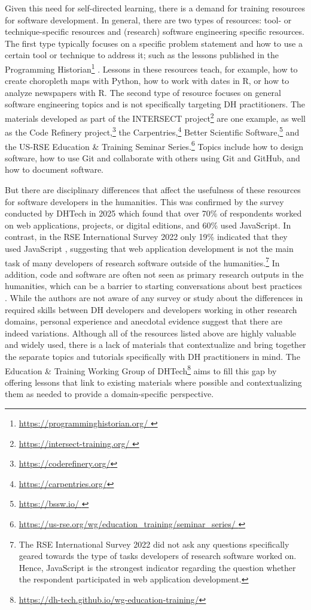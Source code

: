 \documentclass[final]{anthology-ch} %
\begin{document}
Given this need for self-directed learning, there is a demand for training resources for software development. In general, there are two types of resources: tool- or technique-specific resources and (research) software engineering specific resources. The first type typically focuses on a specific problem statement and how to use a certain tool or technique to address it; such as the  lessons published in the Programming Historian\footnote{\url{https://programminghistorian.org/
}} \cite{mullen2025, ryan2021}. Lessons in these resources teach, for example, how to create choropleth maps with Python, how to work with dates in R, or how to analyze newspapers with R. The second type of resource focuses on general software engineering topics and is not specifically targeting DH practitioners. The materials developed as part of the INTERSECT project\footnote{\url{https://intersect-training.org/
}} are one example, as well as the Code Refinery project,\footnote{\url{https://coderefinery.org/}} the Carpentries,\footnote{\url{https://carpentries.org/}} Better Scientific Software,\footnote{\url{https://bssw.io/
}} and the US-RSE Education \& Training Seminar Series.\footnote{\url{https://us-rse.org/wg/education\_training/seminar\_series/
}} Topics include how to design software, how to use Git and collaborate with others using Git and GitHub, and how to document software.

But there are disciplinary differences that affect the usefulness of these resources for software developers in the humanities. This was confirmed by the survey conducted by DHTech in 2025 which found that over 70\% of respondents worked on web applications, projects, or digital editions, and 60\% used JavaScript. In contrast, in the RSE International Survey 2022 only 19\% indicated that they used JavaScript \cite{hettrick2022}, suggesting that web application development is not the main task of many developers of research software outside of the humanities.\footnote{The RSE International Survey 2022 did not ask any questions specifically geared towards the type of tasks developers of research software worked on. Hence, JavaScript is the strongest indicator regarding the question whether the respondent participated in web application development.
} In addition, code and software are often not seen as primary research outputs in the humanities, which can be a barrier to starting conversations about best practices \cite{vanzundert2020}. While the authors are not aware of any survey or study about the differences in required skills between DH developers and developers working in other research domains, personal experience and anecdotal evidence suggest that there are indeed variations. Although all of the resources listed above are highly valuable and widely used, there is a lack of materials that contextualize and bring together the separate topics and tutorials specifically with DH practitioners in mind. The Education \& Training Working Group of DHTech\footnote{\url{https://dh-tech.github.io/wg-education-training/}} aims to fill this gap by offering lessons that link to existing materials where possible and contextualizing them as needed to provide a domain-specific perspective.
\end{document}
